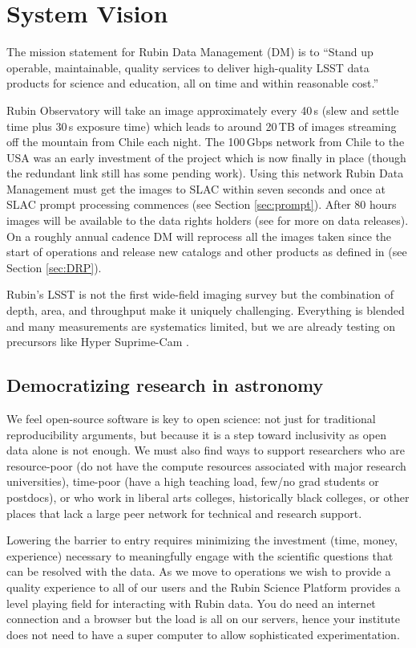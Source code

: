 \documentclass[11pt,twoside]{article}
\begin{document}
\section{System Vision}
The mission statement for Rubin Data Management (DM) is to ``Stand up operable, maintainable, quality services to deliver high-quality LSST data products for science and education, all on time and within reasonable cost.''

Rubin Observatory will take an image approximately every 40\,s (slew and settle time plus 30\,s exposure time) which leads to around 20\,TB of images streaming off the mountain from Chile each night.
The 100\,Gbps network from Chile to the USA was an early investment of the project which is now finally in place (though the redundant link still has some pending work).
Using this network Rubin Data Management must get the images to SLAC within seven seconds and once at SLAC prompt processing commences (see Section \ref{sec:prompt}).
After 80 hours images will be available to the data rights holders (see \citet{RDO-011} for more on data releases).
On a roughly annual cadence DM will reprocess all the images taken since the start of operations and release new catalogs and other products as defined in \citet{LSE-163} (see Section \ref{sec:DRP}).

Rubin’s LSST is not the first wide-field imaging survey but the combination of depth, area, and throughput make it uniquely challenging.
Everything is blended and many measurements are systematics limited, but
we are already testing  on precursors like Hyper Suprime-Cam \citep[HSC;][]{2018PASJ...70S...5B}.


\subsection{Democratizing research in astronomy}

We feel open-source software is key to open science: not just for traditional reproducibility arguments, but because it is a step toward inclusivity as
open data alone is not enough.
We must also find ways to support researchers who are resource-poor (do not have the compute resources associated with major research universities), time-poor (have a high teaching load, few/no grad students or postdocs), or who work in liberal arts colleges, historically black colleges, or other places that lack a large peer network for technical and research support.

Lowering the barrier to entry requires minimizing the investment (time, money, experience) necessary to meaningfully engage with the scientific questions that can be resolved with the data.
As we move to operations we wish to provide a quality experience to all of our users and the Rubin Science Platform provides a level playing field for interacting with Rubin data.
You do need an internet connection and a browser but the load is all on our servers, hence your institute does not need to have a super computer to allow sophisticated experimentation.
\end{document}

